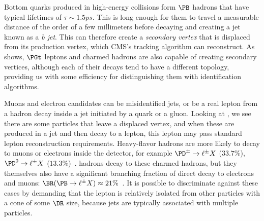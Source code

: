 Bottom quarks produced in high-energy collisions form $\PB$ hadrons that have typical lifetimes of \mbox{$\tau\sim1.5\unit{ps}$}. This is long enough for them to travel a measurable distance of the order of a few millimeters %
before decaying and creating a jet known as a \emph{b jet}. This can therefore create a \emph{secondary vertex} that is displaced from its production vertex, which CMS's tracking algorithm can reconstruct.
As  shows, $\PGt$ leptons and charmed hadrons are also capable of creating secondary vertices, although each of their decays tend to have a different topology, providing us with some efficiency for distinguishing them with identification algorithms.

Muons and electron candidates can be misidentified jets, or be a real lepton from a hadron decay inside a jet initiated by a quark or a gluon.
Looking at , we see there are some particles that leave a displaced vertex, and when these are produced in a jet and then decay to a lepton, this lepton may pass standard lepton reconstruction requirements.
Heavy-flavor hadrons are more likely to decay to muons or electrons inside the detector, for example
\mbox{$\PD^\pm\to\ell^\pm X$} ($33.7\%$),
\mbox{$\PD^0\to\ell^\pm X$} ($13.3\%$)~\cite[p.~43,~46]{PDG_2022}.
{\PB} hadrons decay to these charmed hadrons, but they themselves also have a significant branching fraction of direct decay to electrons and muons: \mbox{$\BR(\PB\to\ell^\pm X)\approx21\%$}~\cite[p.~54,~61]{PDG_2022}.
It is possible to discriminate against these cases by demanding that the lepton is relatively isolated from other particles with a cone of some $\DR$ size, because jets are typically associated with multiple particles.


